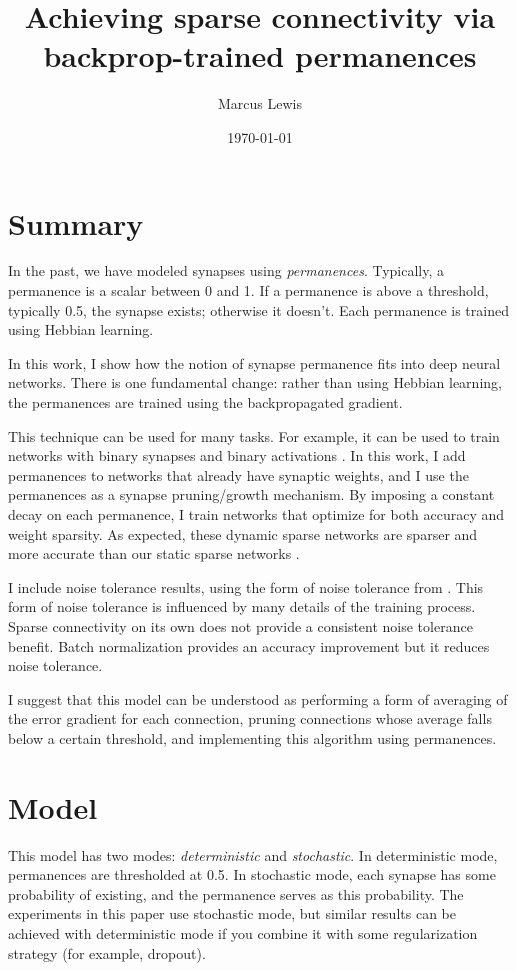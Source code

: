\documentclass[11pt]{article}
\author{Marcus Lewis}
\date{\today}
\title{Achieving sparse connectivity via backprop-trained permanences}
\begin{document}
\maketitle
\frenchspacing

\section{Summary}
\label{sec:orgeabd57d}

In the past, we have modeled synapses using \emph{permanences}. Typically, a permanence is a scalar between 0 and 1. If a permanence is above a threshold, typically 0.5, the synapse exists; otherwise it doesn't. Each permanence is trained using Hebbian learning.

In this work, I show how the notion of synapse permanence fits into deep neural networks. There is one fundamental change: rather than using Hebbian learning, the permanences are trained using the backpropagated gradient.

This technique can be used for many tasks. For example, it can be used to train networks with binary synapses \citep{courbariaux2015binaryconnect} and binary activations \citep{courbariaux2016binarized}. In this work, I add permanences to networks that already have synaptic weights, and I use the permanences as a synapse pruning/growth mechanism. By imposing a constant decay on each permanence, I train networks that optimize for both accuracy and weight sparsity. As expected, these dynamic sparse networks are sparser and more accurate than our static sparse networks \citep{ahmad2019dense}.

I include noise tolerance results, using the form of noise tolerance from \cite{ahmad2019dense}. This form of noise tolerance is influenced by many details of the training process. Sparse connectivity on its own does not provide a consistent noise tolerance benefit. Batch normalization provides an accuracy improvement but it reduces noise tolerance.

I suggest that this model can be understood as performing a form of averaging of the error gradient for each connection, pruning connections whose average falls below a certain threshold, and implementing this algorithm using permanences.


\section{Model}
\label{sec:orgbb0d4e2}

This model has two modes: \emph{deterministic} and \emph{stochastic}. In deterministic mode, permanences are thresholded at 0.5. In stochastic mode, each synapse has some probability of existing, and the permanence serves as this probability. The experiments in this paper use stochastic mode, but similar results can be achieved with deterministic mode if you combine it with some regularization strategy (for example, dropout).
\end{document}
